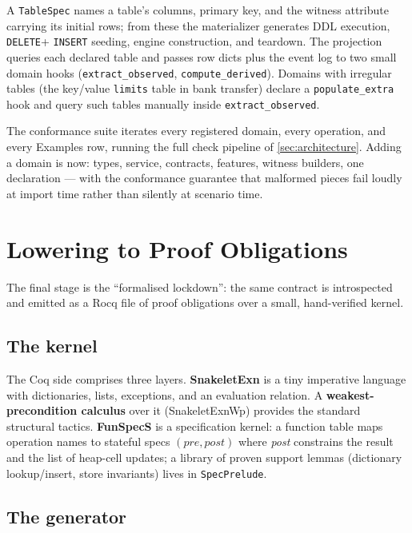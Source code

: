\documentclass[11pt,a4paper]{article}
\begin{document}
A \texttt{TableSpec} names a table's columns, primary key, and the
witness attribute carrying its initial rows; from these the
materializer generates DDL execution, \texttt{DELETE}+
\texttt{INSERT} seeding, engine construction, and teardown.  The
projection queries each declared table and passes row dicts plus the
event log to two small domain hooks (\texttt{extract\_observed},
\texttt{compute\_derived}).  Domains with irregular tables (the
key/value \texttt{limits} table in bank transfer) declare a
\texttt{populate\_extra} hook and query such tables manually inside
\texttt{extract\_observed}.

The conformance suite iterates every registered domain, every
operation, and every Examples row, running the full check pipeline of
\cref{sec:architecture}.  Adding a domain is now: types, service,
contracts, features, witness builders, one declaration --- with the
conformance guarantee that malformed pieces fail loudly at import
time rather than silently at scenario time.

\section{Lowering to Proof Obligations}\label{sec:lowering}

The final stage is the ``formalised lockdown'': the same contract is
introspected and emitted as a Rocq file of proof obligations over a
small, hand-verified kernel.

\subsection{The kernel}

The Coq side comprises three layers.  \textbf{SnakeletExn} is a tiny
imperative language with dictionaries, lists, exceptions, and an
evaluation relation.  A \textbf{weakest-precondition calculus} over it
(SnakeletExnWp) provides the standard structural tactics.
\textbf{FunSpecS} is a specification kernel: a function table maps
operation names to stateful specs $(\mathit{pre}, \mathit{post})$
where \emph{post} constrains the result and the list of heap-cell
updates; a library of proven support lemmas (dictionary lookup/insert,
store invariants) lives in \texttt{SpecPrelude}.

\subsection{The generator}
\end{document}
